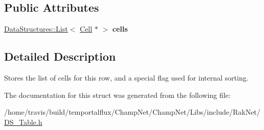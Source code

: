 \subsection*{Public Attributes}
\begin{DoxyCompactItemize}
\item 
\hypertarget{struct_data_structures_1_1_table_1_1_row_adf9117523954e44aca862cdfaf19a2b8}{\hyperlink{class_data_structures_1_1_list}{Data\-Structures\-::\-List}$<$ \hyperlink{struct_data_structures_1_1_table_1_1_cell}{Cell} $\ast$ $>$ {\bfseries cells}}\label{struct_data_structures_1_1_table_1_1_row_adf9117523954e44aca862cdfaf19a2b8}

\end{DoxyCompactItemize}


\subsection{Detailed Description}
Stores the list of cells for this row, and a special flag used for internal sorting. 

The documentation for this struct was generated from the following file\-:\begin{DoxyCompactItemize}
\item 
/home/travis/build/temportalflux/\-Champ\-Net/\-Champ\-Net/\-Libs/include/\-Rak\-Net/\hyperlink{_d_s___table_8h}{D\-S\-\_\-\-Table.\-h}\end{DoxyCompactItemize}
